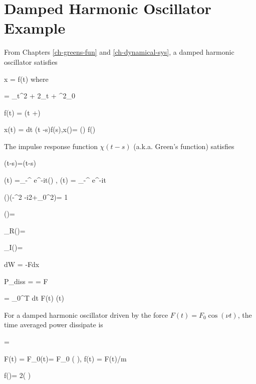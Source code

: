 \section{Damped Harmonic Oscillator Example}

From Chapters \ref{ch-greens-fun}
and \ref{ch-dynamical-sys}, a damped harmonic oscillator satisfies

\beq
\call x = f(t) 
\eeq
where

\beq
\call= \partial_t^2  + 2\gamma \partial_t + \omega^2_0
\eeq



\beq
f(t) = \cos(\omega t +\delta)
\eeq


\beq
x(t) = \int dt \chi(t -s)f(s)\;,\quad x(\omega)=
\chi(\omega) f(\omega)
\eeq

The impulse response function $\chi(t-s)$
(a.k.a. Green's function) satisfies

\beq
\call\chi(t-s)=\delta(t-s)
\eeq

\beq
\chi(t) =\int_{-\infty}^{\infty}
e^{-i\omega t}\chi(\omega)
\;,\quad
\delta(t) =
\int_{-\infty}^{\infty}
e^{-i\omega t}
\eeq

\beq
\chi(\omega)(-\omega^{2} -i2\gamma\omega  +\omega_0^2)= 1
\eeq

\beq
\chi(\omega)=
\eeq

\beq
\chi_R(\omega)=
\quad {}
\eeq

\beq
\chi_I(\omega)=
\quad {}
\eeq

\beq
dW = -Fdx
\eeq

\beq
P_{diss} =   = F 
\eeq

\beq
{}=
\int_0^T dt\; F(t) (t)
\eeq

\begin{claim}
For a damped harmonic oscillator driven by the force $F(t)=F_0\cos(\nu t)$,
the time averaged power dissipate is 

\beq
{}=
\eeq
\end{claim}
\proof
\beq
F(t) = F_0\cos(\nu t)=
 F_0 \left(
\right)\;,\;\;
f(t) = F(t)/m
\eeq

\beq
f(\omega)= 
2\pi \left(
\right)
\eeq

